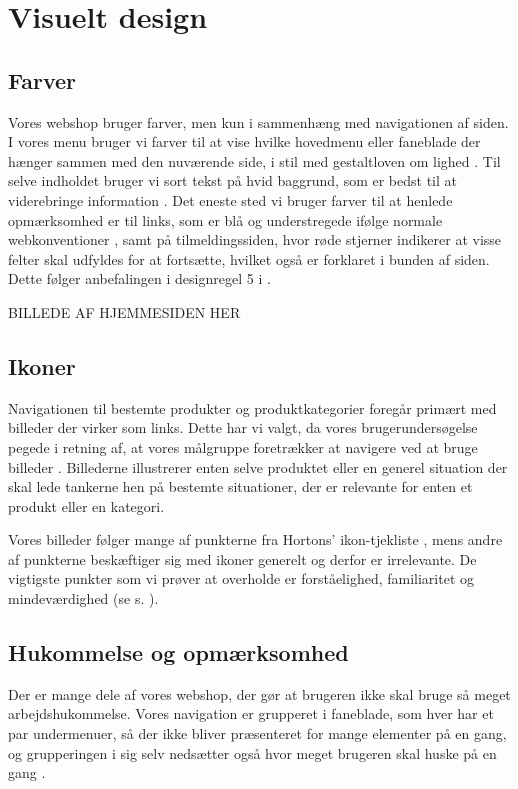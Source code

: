 \chapter{Visuelt design}

\section{Farver}
Vores webshop bruger farver, men kun i sammenhæng med navigationen af siden. I vores menu bruger vi farver til at vise hvilke hovedmenu eller faneblade
der hænger sammen med den nuværende side, i stil med gestaltloven om lighed \cite[s. 336]{Benyon2010}. Til selve indholdet bruger vi sort tekst
på hvid baggrund, som er bedst til at viderebringe information \cite[s. 430]{marcus}. Det eneste sted vi bruger farver til at henlede opmærksomhed er
til links, som er blå og understregede ifølge normale webkonventioner \cite[s. 385]{Benyon2010}, samt på tilmeldingssiden, hvor røde stjerner indikerer at visse felter skal udfyldes for at fortsætte, hvilket også er forklaret i bunden af siden. Dette følger anbefalingen i designregel 5 i \cite[s. 344]{Benyon2010}.

BILLEDE AF HJEMMESIDEN HER

\section{Ikoner}
Navigationen til bestemte produkter og produktkategorier foregår primært med billeder der virker som links. Dette har vi valgt, da vores brugerundersøgelse
pegede i retning af, at vores målgruppe foretrækker at navigere ved at bruge billeder \cite{os}. Billederne illustrerer enten selve produktet eller en generel situation
der skal lede tankerne hen på bestemte situationer, der er relevante for enten et produkt eller en kategori. 

Vores billeder følger mange af punkterne fra Hortons' ikon-tjekliste \cite[s. 327]{Benyon2010}, mens andre af punkterne beskæftiger sig med ikoner generelt
og derfor er irrelevante. De vigtigste punkter som vi prøver at overholde er forståelighed, familiaritet og mindeværdighed (se s. \pageref{b:p:tilbud}).

\section{Hukommelse og opmærksomhed}
Der er mange dele af vores webshop, der gør at brugeren ikke skal bruge så meget arbejdshukommelse. Vores navigation er grupperet i faneblade, som hver har et par
undermenuer, så der ikke bliver præsenteret for mange elementer på en gang, og grupperingen i sig selv nedsætter også hvor meget brugeren skal huske på en gang
\cite[s. 339]{Benyon2010}.

